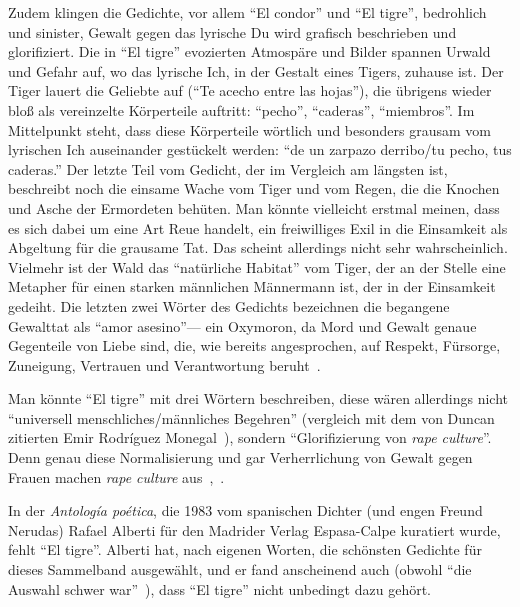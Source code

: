 Zudem klingen die Gedichte, vor allem ``El condor'' und ``El tigre'', bedrohlich und sinister, Gewalt gegen das lyrische Du wird grafisch beschrieben und glorifiziert.
Die in ``El tigre'' evozierten Atmospäre und Bilder spannen Urwald und Gefahr auf, wo das lyrische Ich, in der Gestalt eines Tigers, zuhause ist.
Der Tiger lauert die Geliebte auf (``Te acecho entre las hojas''), die übrigens wieder bloß als vereinzelte Körperteile auftritt: ``pecho'', ``caderas'', ``miembros''.
Im Mittelpunkt steht, dass diese Körperteile wörtlich und besonders grausam vom lyrischen Ich auseinander gestückelt werden:
``de un zarpazo derribo/tu pecho, tus caderas.''
Der letzte Teil vom Gedicht, der im Vergleich am längsten ist, beschreibt noch die einsame Wache vom Tiger und vom Regen, die die Knochen und Asche der Ermordeten behüten.
Man könnte vielleicht erstmal meinen, dass es sich dabei um eine Art Reue handelt, ein freiwilliges Exil in die Einsamkeit als Abgeltung für die grausame Tat.
Das scheint allerdings nicht sehr wahrscheinlich.
Vielmehr ist der Wald das ``natürliche Habitat'' vom Tiger, der an der Stelle eine Metapher für einen starken männlichen Männermann ist, der in der Einsamkeit gedeiht.
Die letzten zwei Wörter des Gedichts bezeichnen die begangene Gewalttat als ``amor asesino''—
ein Oxymoron, da Mord und Gewalt genaue Gegenteile von Liebe sind, die, wie bereits angesprochen, auf Respekt, Fürsorge, Zuneigung, Vertrauen und Verantwortung beruht~\cite{hooks2001}.

Man könnte ``El tigre'' mit drei Wörtern beschreiben, diese wären allerdings nicht ``universell menschliches/männliches Begehren'' (vergleich mit dem von Duncan zitierten Emir Rodríguez Monegal~\cite{Duncan1992}), sondern ``Glorifizierung von \textit{rape culture}''.
Denn genau diese Normalisierung und gar Verherrlichung von Gewalt gegen Frauen machen \textit{rape culture} aus~\cite[S.143-151]{Penny2014},~\cite{Johnson2021}.

\begin{comment}
Rape ist nicht Liebe oder Desire; Es geht um Macht;
Und genau durch solche Aussagen, die solche Vorstellungen normalisieren, anstatt sie als Gewalt zu diffamieren, wird diese weiter aufrechterhalten.
\end{comment}

In der \textit{Antología poética}, die 1983 vom spanischen Dichter (und engen Freund Nerudas) Rafael Alberti für den Madrider Verlag Espasa-Calpe kuratiert wurde, fehlt ``El tigre''.
Alberti hat, nach eigenen Worten, die schönsten Gedichte für dieses Sammelband ausgewählt, und er fand anscheinend auch (obwohl ``die Auswahl schwer war''~\cite{Alberti1983}), dass ``El tigre'' nicht unbedingt dazu gehört.


